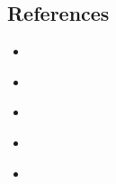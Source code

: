\subsection{References}
\begin{itemize}
  \item \sopSDLC\
  \item \sopSCM\
  \item \sopGDP\
  \item \sopPAP\
  \item \sopISS\
\end{itemize}
